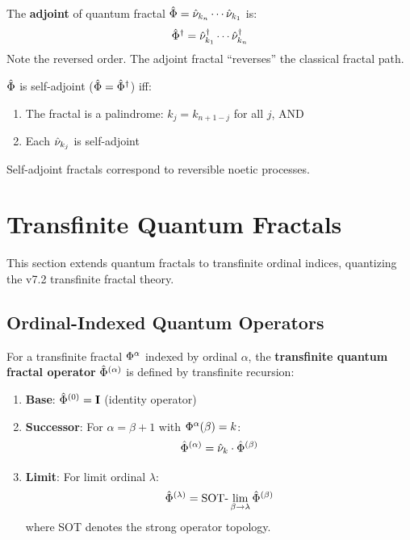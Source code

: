 \begin{definition}
\label{def:adjoint-fractal}
The \textbf{adjoint} of quantum fractal $\hat{\Phi} = \hat{\nu}_{k_n} \cdots \hat{\nu}_{k_1}$ is:
\[
\hat{\Phi}^\dagger = \hat{\nu}_{k_1}^\dagger \cdots \hat{\nu}_{k_n}^\dagger
\]
Note the reversed order. The adjoint fractal ``reverses'' the classical fractal path.
\end{definition}

\begin{proposition}
\label{prop:self-adjoint-fractal}
$\hat{\Phi}$ is self-adjoint ($\hat{\Phi} = \hat{\Phi}^\dagger$) iff:
\begin{enumerate}
  \item The fractal is a palindrome: $k_j = k_{n+1-j}$ for all $j$, AND
  \item Each $\hat{\nu}_{k_j}$ is self-adjoint
\end{enumerate}
Self-adjoint fractals correspond to reversible noetic processes.
\end{proposition}

\section{Transfinite Quantum Fractals}
\label{sec:transfinite-quantum-fractals}

This section extends quantum fractals to transfinite ordinal indices, quantizing the v7.2 transfinite fractal theory.

\subsection{Ordinal-Indexed Quantum Operators}

\begin{definition}
\label{def:transfinite-qfractal}
For a transfinite fractal $\Phi^{\alpha}$ indexed by ordinal $\alpha$, the \textbf{transfinite quantum fractal operator} $\hat{\Phi}^{(\alpha)}$ is defined by transfinite recursion:
\begin{enumerate}
  \item \textbf{Base}: $\hat{\Phi}^{(0)} = \mathbf{I}$ (identity operator)

  \item \textbf{Successor}: For $\alpha = \beta + 1$ with $\Phi^{\alpha}(\beta) = k$:
  \[
  \hat{\Phi}^{(\alpha)} = \hat{\nu}_k \cdot \hat{\Phi}^{(\beta)}
  \]

  \item \textbf{Limit}: For limit ordinal $\lambda$:
  \[
  \hat{\Phi}^{(\lambda)} = \mathrm{SOT}\text{-}\lim_{\beta \to \lambda} \hat{\Phi}^{(\beta)}
  \]
  where SOT denotes the strong operator topology.
\end{enumerate}
\end{definition}

